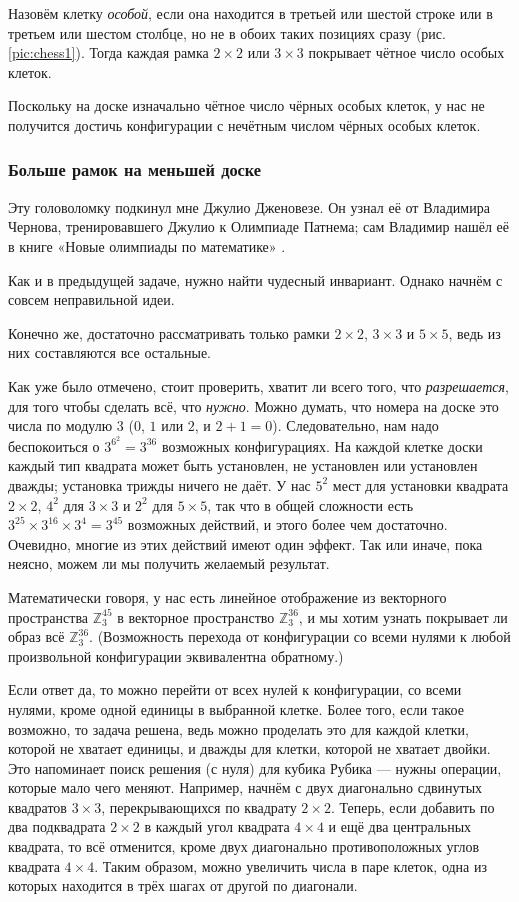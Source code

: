 Назовём клетку \emph{особой}, если она находится в третьей или шестой строке или в третьем или шестом столбце, но не в обоих таких позициях сразу (рис. \ref{pic:chess1}).
Тогда каждая рамка $2 \times 2$ или $3 \times 3$ покрывает чётное число особых клеток.

Поскольку на доске изначально чётное число чёрных особых клеток, у нас не получится достичь конфигурации с нечётным  числом чёрных особых клеток.

\subsubsection*{Больше рамок на меньшей доске}

Эту головоломку подкинул мне Джулио Дженовезе.
Он узнал её от Владимира Чернова, тренировавшего Джулио к Олимпиаде Патнема; сам Владимир нашёл её в книге «Новые олимпиады по математике» \cite{markova}.

Как и в предыдущей задаче, нужно найти чудесный инвариант.
Однако начнём с совсем неправильной идеи.

Конечно же, достаточно рассматривать только рамки $2 \times 2$, $3 \times 3$ и $5 \times 5$, ведь из них составляются все остальные.

Как уже было отмечено, стоит проверить, хватит ли всего того, что \emph{разрешается}, для того чтобы сделать всё, что \emph{нужно}.
Можно думать, что номера на доске это числа по модулю $3$ ($0$, $1$ или $2$, и $2 + 1 = 0$).
Следовательно, нам надо беспокоиться о $3^{6^2} = 3^{36}$ возможных конфигурациях.
На каждой клетке доски каждый тип квадрата может быть установлен, не установлен или установлен дважды; установка трижды ничего не даёт.
У нас $5^2$ мест для установки квадрата $2 \times 2$,
$4^2$ для $3 \times 3$
и $2^2$ для $5 \times 5$, так что в общей сложности есть $3^{25} \times 3^{16} \times 3^4 = 3^{45}$ возможных действий, и этого более чем достаточно.
Очевидно, многие из этих действий имеют один эффект.
Так или иначе, пока неясно, можем ли мы получить желаемый результат.

Математически говоря, у нас есть линейное отображение из векторного пространства $\mathbb{Z}_3^{45}$ в векторное пространство $\mathbb{Z}_3^{36}$, и мы хотим узнать покрывает ли образ всё $\mathbb{Z}_3^{36}$.
(Возможность перехода от конфигурации со всеми нулями к любой произвольной конфигурации эквивалентна обратному.)

Если ответ да, то можно перейти от всех нулей к конфигурации, со всеми нулями, кроме одной единицы в выбранной клетке.
Более того, если такое возможно, то задача решена, ведь можно проделать это для каждой клетки, которой не хватает единицы, и дважды для клетки, которой не хватает двойки.
Это напоминает поиск решения (с нуля) для кубика Рубика --- нужны операции, которые мало чего меняют.
Например, начнём с двух диагонально сдвинутых квадратов $3 \times 3$, перекрывающихся по квадрату $2 \times 2$.
Теперь, если добавить по два подквадрата $2 \times 2$ в каждый угол квадрата $4 \times 4$ и ещё два центральных квадрата, то всё отменится, кроме двух диагонально противоположных углов квадрата $4 \times 4$.
Таким образом, можно увеличить числа в паре клеток, одна из которых находится в трёх шагах от другой по диагонали.

